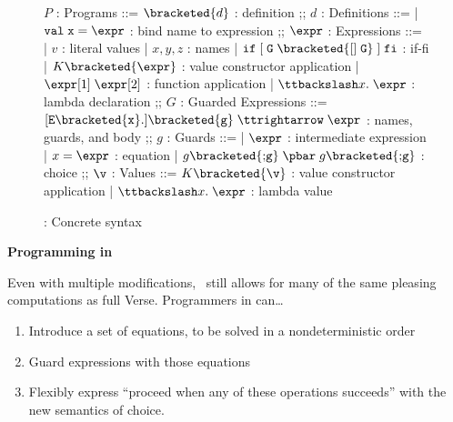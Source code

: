 \documentclass[manuscript,screen,review, 12pt, nonacm]{acmart}
\begin{document}
        \begin{figure}[H]
          \begin{center}
              \begin{bnf}
              $P$ : \textsf{Programs} ::=
              $\bracketed{d}$ : definition
              ;;
              $d$ : \textsf{Definitions} ::=
              | $\tt{val}\; x\; \tt{=}\; \expr$ : bind name to expression
              ;;
              $\expr$ : \textsf{Expressions} ::=
              | $v$ : literal values 
              | $x, y, z$ : names
              | $\tt{if}\; [\; G\; \bracketed{\tt{[]}\; G}\;]\; \tt{fi}$ : if-fi 
              | $K \bracketed{\expr}$ : value constructor application 
              | $\expr[1]\; \expr[2]$ : function application 
              | $\ttbackslash x\tt{.}\; \expr$ : lambda declaration 
              ;;
              $G$ : \textsf{Guarded Expressions} ::=  
              $[\tt{E }{\bracketed{x}}{\tt{.}}] \bracketed{g} \;\ttrightarrow\; \expr$ : names, guards, and body
              ;;
              $g$ : \textsf{Guards} ::=  
              | $\expr$ : intermediate expression 
              | $x \;\tt{=}\; \expr$ : equation 
              | $ g \bracketed{\tt{;} g} \; \pbar \; g \bracketed{\tt{;} g}$ : choice 
              ;;
              $\v$ : Values ::= $K\bracketed{\v}$ : value constructor application 
              | $\ttbackslash x\tt{.}\; \expr$ : lambda value
              \end{bnf}
          \end{center}
              \caption{\VMinus: Concrete syntax}
              \label{fig:vmsyntax}
              \end{figure}      

    \bf{Programming in \VMinus}


        
    Even with multiple modifications, \VMinus\ still allows for many of the same
    pleasing computations as full Verse. Programmers in \VMinus can\dots
        \begin{enumerate}
            \item Introduce a set of equations, to be solved in a
            nondeterministic order 
            \item Guard expressions with those equations 
            \item Flexibly express “proceed when any of these operations
            succeeds” with the new semantics of choice.  
        \end{enumerate}
\end{document}
